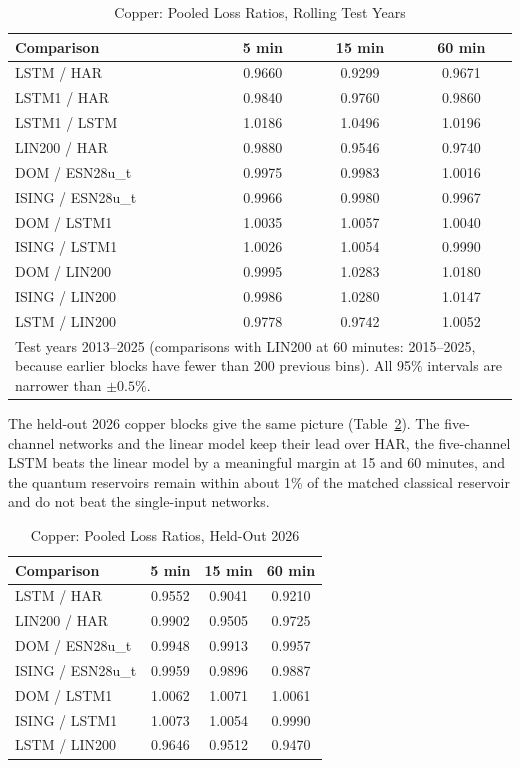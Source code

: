 \documentclass{ieeeaccess}
\begin{document}
\begin{table}[t]
\caption{Copper: Pooled Loss Ratios, Rolling Test Years}
\label{tab:ladder}
\centering
\begin{tabular}{lccc}
\hline
Comparison & 5 min & 15 min & 60 min \\
\hline
LSTM / HAR & 0.9660 & 0.9299 & 0.9671 \\
LSTM1 / HAR & 0.9840 & 0.9760 & 0.9860 \\
LSTM1 / LSTM & 1.0186 & 1.0496 & 1.0196 \\
LIN200 / HAR & 0.9880 & 0.9546 & 0.9740 \\
DOM / ESN28u\_t & 0.9975 & 0.9983 & 1.0016 \\
ISING / ESN28u\_t & 0.9966 & 0.9980 & 0.9967 \\
DOM / LSTM1 & 1.0035 & 1.0057 & 1.0040 \\
ISING / LSTM1 & 1.0026 & 1.0054 & 0.9990 \\
DOM / LIN200 & 0.9995 & 1.0283 & 1.0180 \\
ISING / LIN200 & 0.9986 & 1.0280 & 1.0147 \\
LSTM / LIN200 & 0.9778 & 0.9742 & 1.0052 \\
\hline
\multicolumn{4}{p{7.6cm}}{\footnotesize Test years 2013--2025 (comparisons with LIN200 at 60 minutes: 2015--2025, because earlier blocks have fewer than 200 previous bins). All 95\% intervals are narrower than $\pm0.5\%$.}\\
\end{tabular}
\end{table}

The held-out 2026 copper blocks give the same picture (Table~\ref{tab:copperheld}). The five-channel networks and the linear model keep their lead over HAR, the five-channel LSTM beats the linear model by a meaningful margin at 15 and 60 minutes, and the quantum reservoirs remain within about 1\% of the matched classical reservoir and do not beat the single-input networks.

\begin{table}[t]
\caption{Copper: Pooled Loss Ratios, Held-Out 2026}
\label{tab:copperheld}
\centering
\begin{tabular}{lccc}
\hline
Comparison & 5 min & 15 min & 60 min \\
\hline
LSTM / HAR & 0.9552 & 0.9041 & 0.9210 \\
LIN200 / HAR & 0.9902 & 0.9505 & 0.9725 \\
DOM / ESN28u\_t & 0.9948 & 0.9913 & 0.9957 \\
ISING / ESN28u\_t & 0.9959 & 0.9896 & 0.9887 \\
DOM / LSTM1 & 1.0062 & 1.0071 & 1.0061 \\
ISING / LSTM1 & 1.0073 & 1.0054 & 0.9990 \\
LSTM / LIN200 & 0.9646 & 0.9512 & 0.9470 \\
\hline
\end{tabular}
\end{table}
\end{document}
